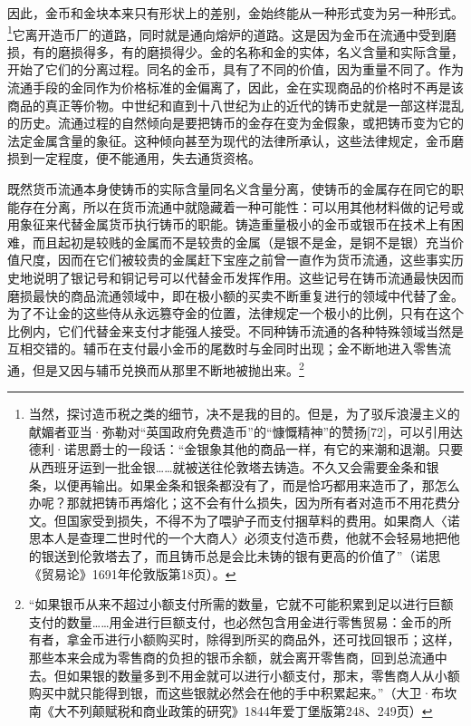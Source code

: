 \documentclass{ctexbook}
\begin{document}
        因此，金币和金块本来只有形状上的差别，金始终能从一种形式变为另一种形式。\footnote{当然，探讨造币税之类的细节，决不是我的目的。但是，为了驳斥浪漫主义的献媚者亚当·弥勒对“英国政府免费造币”的“慷慨精神”的赞扬[72]，可以引用达德利·诺思爵士的一段话：“金银象其他的商品一样，有它的来潮和退潮。只要从西班牙运到一批金银……就被送往伦敦塔去铸造。不久又会需要金条和银条，以便再输出。如果金条和银条都没有了，而是恰巧都用来造币了，那怎么办呢？那就把铸币再熔化；这不会有什么损失，因为所有者对造币不用花费分文。但国家受到损失，不得不为了喂驴子而支付捆草料的费用。如果商人〈诺思本人是查理二世时代的一个大商人〉必须支付造币费，他就不会轻易地把他的银送到伦敦塔去了，而且铸币总是会比未铸的银有更高的价值了”（诺思《贸易论》1691年伦敦版第18页）。}它离开造币厂的道路，同时就是通向熔炉的道路。这是因为金币在流通中受到磨损，有的磨损得多，有的磨损得少。金的名称和金的实体，名义含量和实际含量，开始了它们的分离过程。同名的金币，具有了不同的价值，因为重量不同了。作为流通手段的金同作为价格标准的金偏离了，因此，金在实现商品的价格时不再是该商品的真正等价物。中世纪和直到十八世纪为止的近代的铸币史就是一部这样混乱的历史。流通过程的自然倾向是要把铸币的金存在变为金假象，或把铸币变为它的法定金属含量的象征。这种倾向甚至为现代的法律所承认，这些法律规定，金币磨损到一定程度，便不能通用，失去通货资格。
        
        既然货币流通本身使铸币的实际含量同名义含量分离，使铸币的金属存在同它的职能存在分离，所以在货币流通中就隐藏着一种可能性：可以用其他材料做的记号或用象征来代替金属货币执行铸币的职能。铸造重量极小的金币或银币在技术上有困难，而且起初是较贱的金属而不是较贵的金属（是银不是金，是铜不是银）充当价值尺度，因而在它们被较贵的金属赶下宝座之前曾一直作为货币流通，这些事实历史地说明了银记号和铜记号可以代替金币发挥作用。这些记号在铸币流通最快因而磨损最快的商品流通领域中，即在极小额的买卖不断重复进行的领域中代替了金。为了不让金的这些侍从永远篡夺金的位置，法律规定一个极小的比例，只有在这个比例内，它们代替金来支付才能强人接受。不同种铸币流通的各种特殊领域当然是互相交错的。辅币在支付最小金币的尾数时与金同时出现；金不断地进入零售流通，但是又因与辅币兑换而从那里不断地被抛出来。\footnote{“如果银币从来不超过小额支付所需的数量，它就不可能积累到足以进行巨额支付的数量……用金进行巨额支付，也必然包含用金进行零售贸易：金币的所有者，拿金币进行小额购买时，除得到所买的商品外，还可找回银币；这样，那些本来会成为零售商的负担的银币余额，就会离开零售商，回到总流通中去。但如果银的数量多到不用金就可以进行小额支付，那末，零售商人从小额购买中就只能得到银，而这些银就必然会在他的手中积累起来。”（大卫·布坎南《大不列颠赋税和商业政策的研究》1844年爱丁堡版第248、249页）}
        
\end{document}
